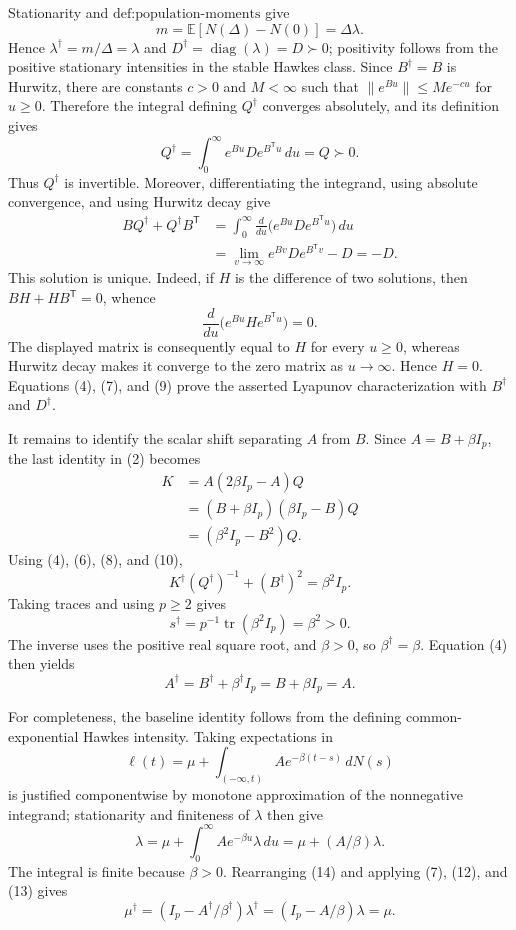 Stationarity and \(\text{def:population-moments}\) give
\[
 m=\mathbb E[N(\Delta)-N(0)]=\Delta\lambda.
\tag{7}
\]
Hence \(\lambda^\dagger=m/\Delta=\lambda\) and \(D^\dagger=\operatorname{diag}(\lambda)=D\succ0\); positivity follows from the positive stationary intensities in the stable Hawkes class.  Since \(B^\dagger=B\) is Hurwitz, there are constants \(c>0\) and \(M<\infty\) such that \(\lVert e^{Bu}\rVert\leq Me^{-cu}\) for \(u\geq0\).  Therefore the integral defining \(Q^\dagger\) converges absolutely, and its definition gives
\[
 Q^\dagger
 =\int_0^\infty e^{Bu}De^{B^{\mathsf T}u}\,du
 =Q\succ0.
\tag{8}
\]
Thus \(Q^\dagger\) is invertible.  Moreover, differentiating the integrand, using absolute convergence, and using Hurwitz decay give
\[
 \begin{aligned}
 BQ^\dagger+Q^\dagger B^{\mathsf T}
 &=\int_0^\infty \frac{d}{du}
   \bigl(e^{Bu}De^{B^{\mathsf T}u}\bigr)\,du\\
 &=\lim_{v\to\infty}e^{Bv}De^{B^{\mathsf T}v}-D
 =-D.
 \end{aligned}
\tag{9}
\]
This solution is unique.  Indeed, if \(H\) is the difference of two solutions, then \(BH+HB^{\mathsf T}=0\), whence
\[
 \frac{d}{du}\bigl(e^{Bu}He^{B^{\mathsf T}u}\bigr)=0.
\]
The displayed matrix is consequently equal to \(H\) for every \(u\geq0\), whereas Hurwitz decay makes it converge to the zero matrix as \(u\to\infty\).  Hence \(H=0\).  Equations (4), (7), and (9) prove the asserted Lyapunov characterization with \(B^\dagger\) and \(D^\dagger\).

It remains to identify the scalar shift separating \(A\) from \(B\).  Since \(A=B+\beta I_p\), the last identity in (2) becomes
\[
 \begin{aligned}
 K
 &=A(2\beta I_p-A)Q\\
 &=(B+\beta I_p)(\beta I_p-B)Q\\
 &=(\beta^2I_p-B^2)Q.
 \end{aligned}
\tag{10}
\]
Using (4), (6), (8), and (10),
\[
 K^\dagger(Q^\dagger)^{-1}+(B^\dagger)^2
 =\beta^2I_p.
\tag{11}
\]
Taking traces and using \(p\geq2\) gives
\[
 s^\dagger
 =p^{-1}\operatorname{tr}(\beta^2I_p)
 =\beta^2>0.
\tag{12}
\]
The inverse uses the positive real square root, and \(\beta>0\), so \(\beta^\dagger=\beta\).  Equation (4) then yields
\[
 A^\dagger=B^\dagger+\beta^\dagger I_p
 =B+\beta I_p=A.
\tag{13}
\]

For completeness, the baseline identity follows from the defining common-exponential Hawkes intensity.  Taking expectations in
\[
 \ell(t)=\mu+\int_{(-\infty,t)}Ae^{-\beta(t-s)}\,dN(s)
\]
is justified componentwise by monotone approximation of the nonnegative integrand; stationarity and finiteness of \(\lambda\) then give
\[
 \lambda
 =\mu+\int_0^\infty Ae^{-\beta u}\lambda\,du
 =\mu+(A/\beta)\lambda.
\tag{14}
\]
The integral is finite because \(\beta>0\).  Rearranging (14) and applying (7), (12), and (13) gives
\[
 \mu^\dagger
 =(I_p-A^\dagger/\beta^\dagger)\lambda^\dagger
 =(I_p-A/\beta)\lambda
 =\mu.
\tag{15}
\]

